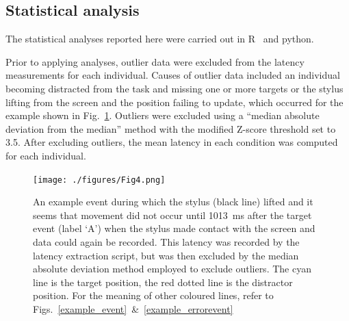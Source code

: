 \documentclass[10pt,letterpaper]{article}
\newcommand{\filename}[1]{\textsf{\textbf{#1}}}
\newcommand{\codeparam}[1]{\textsf{\textbf{#1}}}
\begin{document}
\subsection*{Statistical analysis}

%
The statistical analyses reported here were carried out in
R~\cite{r_core_team_r:_2013} and python.

Prior to applying analyses, outlier data were excluded from the
latency measurements for each individual.
%
%
Causes of outlier data included an individual becoming distracted from
the task and missing one or more targets or the stylus lifting from
the screen and the position failing to update, which occurred for the
example shown in Fig.~\ref{stylus_lifted}. Outliers were excluded
using a ``median absolute deviation from the median'' method
\cite{boris_iglewicz_how_1993} with the modified Z-score threshold set
to 3.5. After excluding outliers, the mean latency in each condition
was computed for each individual.

\begin{figure}[htb!]
\centering
\texttt{[image: ./figures/Fig4.png]} %
\caption[Stylus lifted] {An example event during which the stylus
  (black line) lifted and it seems that movement did not occur until
  1013~ms after the target event (label `A') when the stylus made
  contact with the screen and data could again be recorded. This
  latency was recorded by the latency extraction script, but was then
  excluded by the median absolute deviation method employed to exclude
  outliers. The cyan line is the target position, the red dotted line
  is the distractor position. For the meaning of other coloured lines,
  refer to Figs.~\ref{example_event}~\&~\ref{example_errorevent}}
\label{stylus_lifted}
\end{figure}
\end{document}
